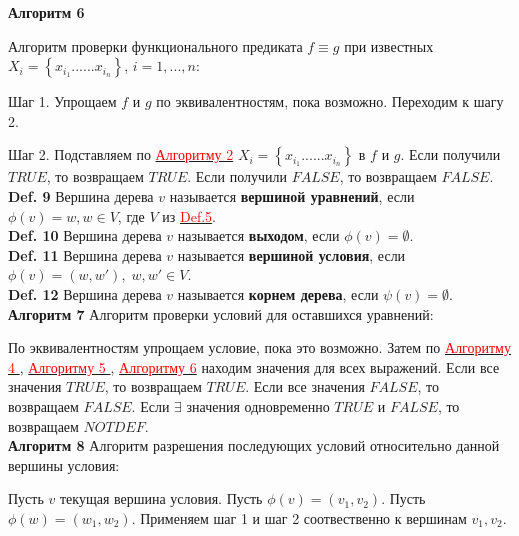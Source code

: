\documentclass[12pt]{article}
\begin{document}
      \hypertarget{a6}{{\bf Алгоритм 6}} Алгоритм проверки функционального предиката $f \equiv g $ при известных $ X_{i} = \left\lbrace x_{i_{1}} ......x_{i_{n}}\right\rbrace $, $i = 1,...,n$:
      
      Шаг 1. Упрощаем $f$ и $g$ по эквивалентностям, пока возможно. Переходим к шагу 2.
      
      Шаг 2. Подставляем по \hyperlink{a2}{ \textcolor{red}{Алгоритму 2}} $ X_{i} = \left\lbrace x_{i_{1}} ......x_{i_{n}}\right\rbrace $ в $f$ и $g$. Если получили $TRUE$, то возвращаем  $TRUE$.  Если получили $FALSE$, то возвращаем  $FALSE$.
     \\
     
     {\bf Def. 9} Вершина дерева $v$ называется {\bf вершиной уравнений}, если
     $\phi(v)=w , w \in V$, где $V$ из \hyperlink{d5}{ \textcolor{red}{Def.5}}.
     \\
     
     {\bf Def. 10} Вершина дерева $v$ называется {\bf выходом}, если
     $\phi(v)= \emptyset$.
     \\
      
     {\bf Def. 11} Вершина дерева $v$ называется {\bf вершиной условия}, если
     $\phi(v)=(w,w') ,\; w,w' \in V$.
     \\
     
     {\bf Def. 12}  Вершина дерева $v$ называется {\bf корнем дерева}, если
      $\psi(v) = \emptyset$.
      \\
      
      \hypertarget{a7}{{\bf Алгоритм 7}} Алгоритм проверки условий для оставшихся уравнений:
     
       
       По эквивалентностям упрощаем условие, пока это возможно. Затем по   \hyperlink{a4}{ \textcolor{red}{Алгоритму 4 }},  \hyperlink{a5}{ \textcolor{red}{Алгоритму 5 }},  \hyperlink{a6}{ \textcolor{red}{Алгоритму 6}} находим значения для всех выражений. Если все значения $TRUE$, то возвращаем $TRUE$. Если все значения $FALSE$, то возвращаем $FALSE$. Если $\exists$ значения одновременно $TRUE$ и $FALSE$, то возвращаем $NOTDEF$.
      \\
      
      \hypertarget{a8}{{\bf Алгоритм 8}} Алгоритм разрешения последующих условий относительно данной вершины условия:
      
       Пусть $v$ текущая вершина условия. Пусть $\phi(v)=(v_{1},v_{2})$. Пусть $\phi(w)=(w_{1},w_{2})$. Применяем шаг 1 и шаг 2 соотвественно к вершинам $v_{1},v_{2}$.
       
\end{document}
